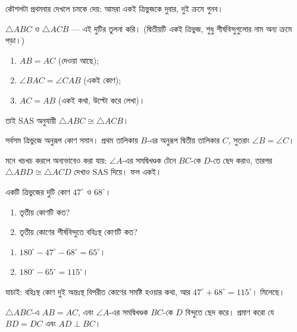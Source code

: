 \documentclass[11pt]{article}
\begin{document}
\begin{solbox}
কৌশলটা প্রথমবার দেখলে চমকে দেয়: আমরা একই ত্রিভুজকে দুবার, দুই ক্রমে গুনব।

$\triangle ABC$ ও $\triangle ACB$ --- এই দুটির তুলনা করি। (দ্বিতীয়টি একই
ত্রিভুজ, শুধু শীর্ষবিন্দুগুলোর নাম অন্য ক্রমে পড়া।)
\begin{enumerate}
  \item $AB = AC$ (দেওয়া আছে);
  \item $\angle BAC = \angle CAB$ (একই কোণ);
  \item $AC = AB$ (একই কথা, উল্টো করে লেখা)।
\end{enumerate}
তাই SAS অনুযায়ী $\triangle ABC \cong \triangle ACB$।

সর্বসম ত্রিভুজে অনুরূপ কোণ সমান। প্রথম তালিকায় $B$-এর অনুরূপ দ্বিতীয় তালিকার
$C$, সুতরাং $\angle B = \angle C$।

মনে খচখচ করলে অন্যভাবেও করা যায়: $\angle A$-এর সমদ্বিখণ্ডক টেনে $BC$-কে $D$-তে
ছেদ করাও, তারপর $\triangle ABD \cong \triangle ACD$ দেখাও SAS দিয়ে। ফল একই।
\end{solbox}

 একটি ত্রিভুজের দুটি কোণ $47^\circ$ ও $68^\circ$।
\begin{enumerate}
  \item তৃতীয় কোণটি কত?
  \item তৃতীয় কোণের শীর্ষবিন্দুতে বহিঃস্থ কোণটি কত?
\end{enumerate}

\begin{sol}
\begin{enumerate}
  \item $180^\circ - 47^\circ - 68^\circ = 65^\circ$।
  \item $180^\circ - 65^\circ = 115^\circ$।
\end{enumerate}
যাচাই: বহিঃস্থ কোণ দুই অন্তঃস্থ বিপরীত কোণের সমষ্টি হওয়ার কথা, আর
$47^\circ + 68^\circ = 115^\circ$। মিলেছে।
\end{sol}

 $\triangle ABC$-এ $AB = AC$, এবং $\angle A$-এর সমদ্বিখণ্ডক $BC$-কে
$D$ বিন্দুতে ছেদ করে। প্রমাণ করো যে $BD = DC$ এবং $AD \perp BC$।
\end{document}
